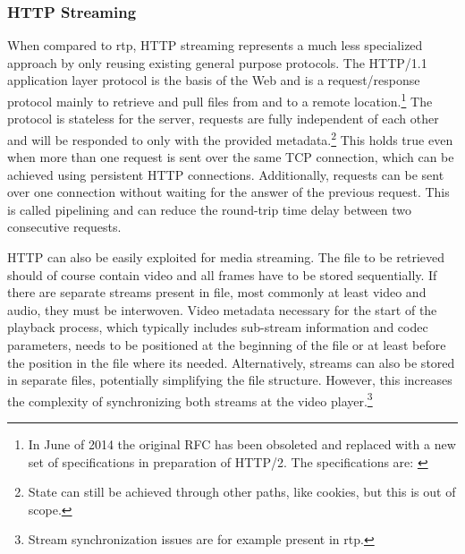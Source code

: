 \subsubsection{\texorpdfstring{\acrshort{HTTP}}{HTTP} Streaming}

When compared to \gls{rtp}, \gls{HTTP} streaming represents a much less specialized approach by only reusing existing general purpose protocols. The \gls{HTTP}/1.1~\autocite{rfc2616} application layer protocol is the basis of the Web and is a request/response protocol mainly to retrieve and pull files from and to a remote location.\footnote{In June of 2014 the original \acrshort{RFC} has been obsoleted and replaced with a new set of specifications in preparation of \gls{HTTP}/2. The specifications are: \autocite{rfc7230,rfc7231,rfc7232,rfc7233,rfc7234,rfc7235,rfc7236,rfc7237,rfc7238,rfc7239}} The protocol is stateless for the server, requests are fully independent of each other and will be responded to only with the provided metadata.\footnote{State can still be achieved through other paths, like cookies, but this is out of scope.} This holds true even when more than one request is sent over the same \gls{TCP} connection, which can be achieved using persistent \gls{HTTP} connections. Additionally, requests can be sent over one connection without waiting for the answer of the previous request. This is called pipelining and can reduce the round-trip time delay between two consecutive requests.

\gls{HTTP} can also be easily exploited for media streaming. The file to be retrieved should of course contain video and all frames have to be stored sequentially. If there are separate streams present in file, most commonly at least video and audio, they must be interwoven. Video metadata necessary for the start of the playback process, which typically includes sub-stream information and codec parameters, needs to be positioned at the beginning of the file or at least before the position in the file where its needed. Alternatively, streams can also be stored in separate files, potentially simplifying the file structure. However, this increases the complexity of synchronizing both streams at the video player.\footnote{Stream synchronization issues are for example present in \gls{rtp}.}

